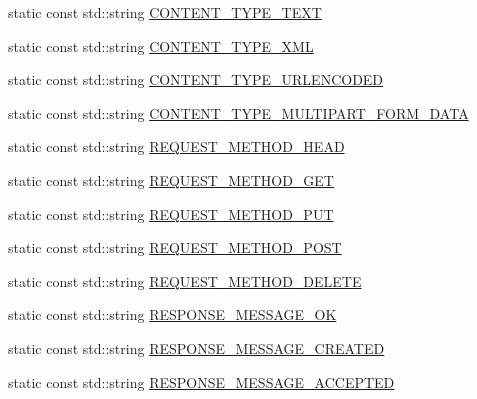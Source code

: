 \begin{DoxyCompactItemize}
static const std\-::string \hyperlink{structpion_1_1http_1_1types_a503a1918d9f37cc4ec6bd4229d3952bf}{C\-O\-N\-T\-E\-N\-T\-\_\-\-T\-Y\-P\-E\-\_\-\-T\-E\-X\-T}
\item 
static const std\-::string \hyperlink{structpion_1_1http_1_1types_a49900068a6ffb8699df017f689a3bdb9}{C\-O\-N\-T\-E\-N\-T\-\_\-\-T\-Y\-P\-E\-\_\-\-X\-M\-L}
\item 
static const std\-::string \hyperlink{structpion_1_1http_1_1types_a7c3a7283e007c9666c2e97ad9b5eecfa}{C\-O\-N\-T\-E\-N\-T\-\_\-\-T\-Y\-P\-E\-\_\-\-U\-R\-L\-E\-N\-C\-O\-D\-E\-D}
\item 
static const std\-::string \hyperlink{structpion_1_1http_1_1types_ab85889d9ccd680e47988646d290b0725}{C\-O\-N\-T\-E\-N\-T\-\_\-\-T\-Y\-P\-E\-\_\-\-M\-U\-L\-T\-I\-P\-A\-R\-T\-\_\-\-F\-O\-R\-M\-\_\-\-D\-A\-T\-A}
\item 
static const std\-::string \hyperlink{structpion_1_1http_1_1types_af988464448ca2741b8277b464ade4d16}{R\-E\-Q\-U\-E\-S\-T\-\_\-\-M\-E\-T\-H\-O\-D\-\_\-\-H\-E\-A\-D}
\item 
static const std\-::string \hyperlink{structpion_1_1http_1_1types_a41df465e1665956a34c25401943c8a1f}{R\-E\-Q\-U\-E\-S\-T\-\_\-\-M\-E\-T\-H\-O\-D\-\_\-\-G\-E\-T}
\item 
static const std\-::string \hyperlink{structpion_1_1http_1_1types_a3740184a9ca3686a2e7ec0a6a5869971}{R\-E\-Q\-U\-E\-S\-T\-\_\-\-M\-E\-T\-H\-O\-D\-\_\-\-P\-U\-T}
\item 
static const std\-::string \hyperlink{structpion_1_1http_1_1types_a31458141c7a1704b8e24fbfaa0f92e6c}{R\-E\-Q\-U\-E\-S\-T\-\_\-\-M\-E\-T\-H\-O\-D\-\_\-\-P\-O\-S\-T}
\item 
static const std\-::string \hyperlink{structpion_1_1http_1_1types_a442f3bad1e148210bc02b364a13bd703}{R\-E\-Q\-U\-E\-S\-T\-\_\-\-M\-E\-T\-H\-O\-D\-\_\-\-D\-E\-L\-E\-T\-E}
\item 
static const std\-::string \hyperlink{structpion_1_1http_1_1types_a0aaeb54afab3950bd0c36e6213e997be}{R\-E\-S\-P\-O\-N\-S\-E\-\_\-\-M\-E\-S\-S\-A\-G\-E\-\_\-\-O\-K}
\item 
static const std\-::string \hyperlink{structpion_1_1http_1_1types_aebc4500ff17c3fe3c89f81ef24da765f}{R\-E\-S\-P\-O\-N\-S\-E\-\_\-\-M\-E\-S\-S\-A\-G\-E\-\_\-\-C\-R\-E\-A\-T\-E\-D}
\item 
static const std\-::string \hyperlink{structpion_1_1http_1_1types_ae73856adf6fa589178d5c88cd6285974}{R\-E\-S\-P\-O\-N\-S\-E\-\_\-\-M\-E\-S\-S\-A\-G\-E\-\_\-\-A\-C\-C\-E\-P\-T\-E\-D}
\item 

\end{DoxyCompactItemize}
